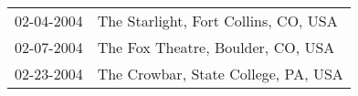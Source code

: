 \begin{supertabular}{ll}
 02-04-2004 &  The Starlight, Fort Collins, CO, USA \\
 02-07-2004 &     The Fox Theatre, Boulder, CO, USA \\
 02-23-2004 &   The Crowbar, State College, PA, USA \\
\end{supertabular}
